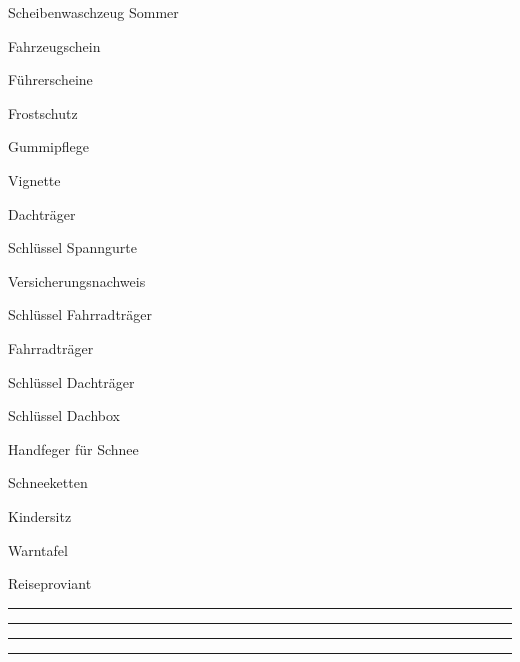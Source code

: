 

\begin{ONEitemize}
    \item{Scheibenwaschzeug Sommer}
    \item{Fahrzeugschein}
    \item{Führerscheine}
    \item{Frostschutz}
    \item{Gummipflege}
    \item{Vignette}
    \item{Dachträger}
    \item{Schlüssel Spanngurte}
    \item{Versicherungsnachweis}
    \item{Schlüssel Fahrradträger}
    \item{Fahrradträger}
    \item{Schlüssel Dachträger}
    \item{Schlüssel Dachbox}
    \item{Handfeger für Schnee}
    \item{Schneeketten}
    \item{Kindersitz}
    \item{Warntafel}
    \item{Reiseproviant}
    \item{\rule{50mm}{0.4pt}}
    \item{\rule{50mm}{0.4pt}}
    \item{\rule{50mm}{0.4pt}}
    \item{\rule{50mm}{0.4pt}}
\end{ONEitemize}
